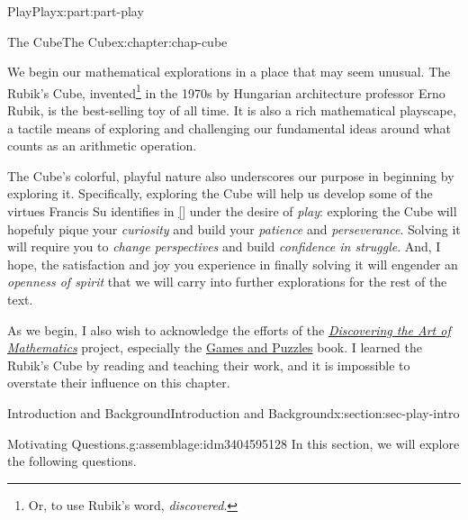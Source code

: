 \documentclass[oneside,10pt,]{book}
\newcommand{\xreffont}{\relax}
\numberwithin{equation}{section}
\begin{document}
\begin{partptx}{Play}{}{Play}{}{}{x:part:part-play}
%
\typeout{************************************************}
\typeout{************************************************}
%
\begin{chapterptx}{The Cube}{}{The Cube}{}{}{x:chapter:chap-cube}
\begin{introduction}{}%
We begin our mathematical explorations in a place that may seem unusual. The Rubik's Cube, invented\footnote{Or, to use Rubik's word, \emph{discovered}.\label{g:fn:idm3404603496}} in the 1970s by Hungarian architecture professor Erno Rubik, is the best-selling toy of all time. It is also a rich mathematical playscape, a tactile means of exploring and challenging our fundamental ideas around what counts as an arithmetic operation.%
\par
The Cube's colorful, playful nature also underscores our purpose in beginning by exploring it. Specifically, exploring the Cube will help us develop some of the virtues Francis Su identifies in \hyperlink{x:biblio:Su2020}{[{\xreffont 1}]} under the desire of \emph{play}: exploring the Cube will hopefuly pique your \emph{curiosity} and build your \emph{patience} and \emph{perseverance}. Solving it will require you to \emph{change perspectives} and build \emph{confidence in struggle}. And, I hope, the satisfaction and joy you experience in finally solving it will engender an \emph{openness of spirit} that we will carry into further explorations for the rest of the text.%
\par
As we begin, I also wish to acknowledge the efforts of the \emph{\href{https://www.artofmathematics.org/}{Discovering the Art of Mathematics}} project, especially the \href{https://www.artofmathematics.org/books/games-and-puzzles}{Games and Puzzles} book. I learned the Rubik's Cube by reading and teaching their work, and it is impossible to overstate their influence on this chapter.%
\end{introduction}%
%
%
\typeout{************************************************}
\typeout{************************************************}
%
\begin{sectionptx}{Introduction and Background}{}{Introduction and Background}{}{}{x:section:sec-play-intro}
\begin{introduction}{}%
\begin{assemblage}{Motivating Questions.}{g:assemblage:idm3404595128}%
In this section, we will explore the following questions. %

\end{assemblage}
\end{introduction}
\end{sectionptx}
\end{chapterptx}
\end{partptx}
\end{document}
